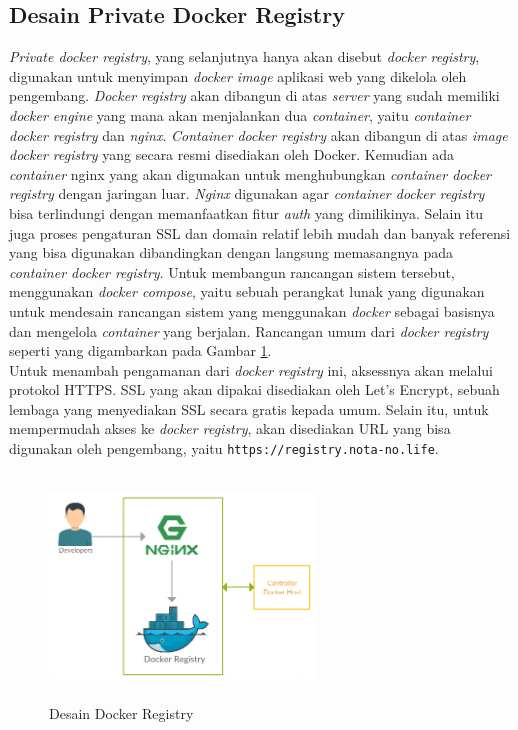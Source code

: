 		\subsection{Desain Private Docker Registry}
			\textit{Private docker registry}, yang selanjutnya hanya akan disebut \textit{docker registry}, digunakan untuk menyimpan \textit{docker image} aplikasi web yang dikelola oleh pengembang. \textit{Docker registry} akan dibangun di atas \textit{server} yang sudah memiliki \textit{docker engine} yang mana akan menjalankan dua \textit{container}, yaitu \textit{container docker registry} dan \textit{nginx}. \textit{Container docker registry} akan dibangun di atas \textit{image docker registry} yang secara resmi disediakan oleh Docker. Kemudian ada \textit{container} nginx yang akan digunakan untuk menghubungkan \textit{container docker registry} dengan jaringan luar. \textit{Nginx} digunakan agar \textit{container docker registry} bisa terlindungi dengan memanfaatkan fitur \textit{auth} yang dimilikinya. Selain itu juga proses pengaturan SSL dan domain relatif lebih mudah dan banyak referensi yang bisa digunakan dibandingkan dengan langsung memasangnya pada \textit{container docker registry}. Untuk membangun rancangan sistem tersebut, menggunakan \textit{docker compose}, yaitu sebuah perangkat lunak yang digunakan untuk mendesain rancangan sistem yang menggunakan \textit{docker} sebagai basisnya dan mengelola \textit{container} yang berjalan. Rancangan umum dari \textit{docker registry} seperti yang digambarkan pada Gambar \ref{desain:dockerregistry}.\\
            \indent Untuk menambah pengamanan dari \textit{docker registry} ini, aksessnya akan melalui protokol HTTPS. SSL yang akan dipakai disediakan oleh Let's Encrypt, sebuah lembaga yang menyediakan SSL secara gratis kepada umum. Selain itu, untuk mempermudah akses ke \textit{docker registry}, akan disediakan URL yang bisa digunakan oleh pengembang, yaitu \texttt{https://registry.nota-no.life}.
			\begin{figure}[H]
				\centering
				\includegraphics[width=7cm,height=6cm]{Images/C-3/dockerregistry.png}
				\caption{Desain Docker Registry}
				\label{desain:dockerregistry}
			\end{figure}
                
